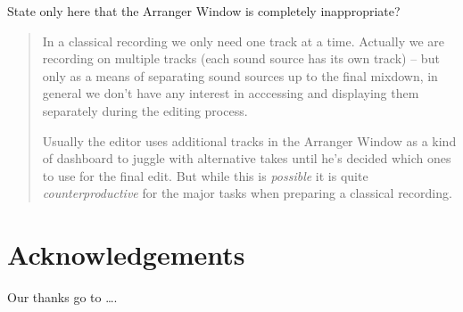 \documentclass[11pt,a4paper]{article}
\begin{document}
State only here that the Arranger Window is completely inappropriate?

\begin{quote}


In a classical recording we only need one track at a time.
Actually we are recording on multiple tracks (each sound source has its own track) -- but only as a means of separating sound sources up to the final mixdown, in general we don't have any interest in acccessing and displaying them separately during the editing process.

Usually the editor uses additional tracks in the Arranger Window as a kind of dashboard to juggle with alternative takes until he's decided which ones to use for the final edit.
But while this is \emph{possible} it is quite \emph{counterproductive} for the major tasks when preparing a classical recording.
\end{quote}

\section{Acknowledgements}

Our thanks go to \ldots .
\end{document}
